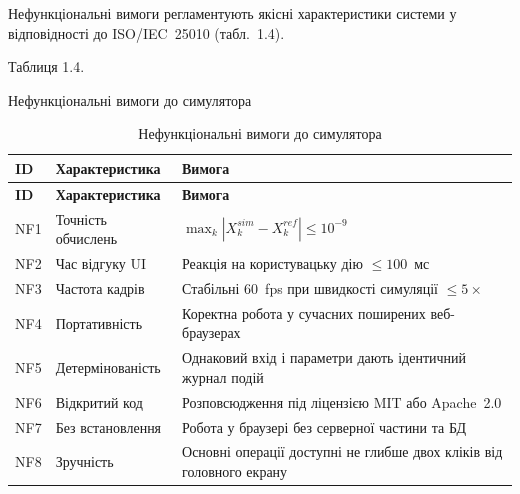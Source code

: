 Нефункціональні вимоги регламентують якісні характеристики системи у
відповідності до ISO/IEC~25010 (табл.~1.4).

Таблиця 1.4.

Нефункціональні вимоги до симулятора

\begin{longtable}[]{@{}
  >{\raggedright\arraybackslash}p{}
  >{\raggedright\arraybackslash}p{}
  >{\raggedright\arraybackslash}p{}@{}}
\caption[Нефункціональні вимоги до симулятора]{Нефункціональні вимоги до
симулятора}\tabularnewline
\toprule\noalign{}
\begin{minipage}[b]{\linewidth}\raggedright
\textbf{ID}
\end{minipage} & \begin{minipage}[b]{\linewidth}\raggedright
\textbf{Характеристика}
\end{minipage} & \begin{minipage}[b]{\linewidth}\raggedright
\textbf{Вимога}
\end{minipage} \\
\midrule\noalign{}
\endfirsthead
\toprule\noalign{}
\begin{minipage}[b]{\linewidth}\raggedright
\textbf{ID}
\end{minipage} & \begin{minipage}[b]{\linewidth}\raggedright
\textbf{Характеристика}
\end{minipage} & \begin{minipage}[b]{\linewidth}\raggedright
\textbf{Вимога}
\end{minipage} \\
\midrule\noalign{}
\endhead
\bottomrule\noalign{}
\endlastfoot
NF1 & Точність обчислень &
\(\max_{k}|X_{k}^{sim} - X_{k}^{ref}| \leq 10^{- 9}\) \\
NF2 & Час відгуку UI & Реакція на користувацьку дію \(\leq 100\)~мс \\
NF3 & Частота кадрів & Стабільні 60~fps при швидкості симуляції
\(\leq 5 \times\) \\
NF4 & Портативність & Коректна робота у сучасних поширених
веб-браузерах \\
NF5 & Детермінованість & Однаковий вхід і параметри дають ідентичний
журнал подій \\
NF6 & Відкритий код & Розповсюдження під ліцензією MIT або Apache~2.0 \\
NF7 & Без встановлення & Робота у браузері без серверної частини та
БД \\
NF8 & Зручність & Основні операції доступні не глибше двох кліків від
головного екрану \\
\end{longtable}

